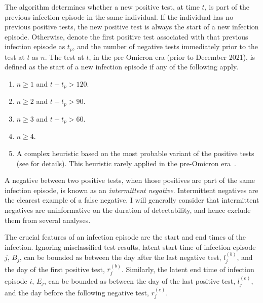 \documentclass[thesis.tex]{subfiles}
\begin{document}
The algorithm determines whether a new positive test, at time $t$, is part of the previous infection episode in the same individual.
If the individual has no previous positive tests, the new positive test is always the start of a new infection episode.
Otherwise, denote the first positive test associated with that previous infection episode as $t_p$, and the number of negative tests immediately prior to the test at $t$ as $n$.
The test at $t$, in the pre-Omicron era (prior to December 2021), is defined as the start of a new infection episode if any of the following apply.
\begin{enumerate}
  \item $n \geq 1$ and $t - t_p > 120$.
  \item $n \geq 2$ and $t - t_p > 90$.
  \item $n \geq 3$ and $t - t_p > 60$.
  \item $n \geq 4$.
  \item A complex heuristic based on the most probable variant of the positive tests (see \textcite{weiRisk} for details). This heuristic rarely applied in the pre-Omicron era~.
\end{enumerate}

A negative between two positive tests, when those positives are part of the same infection episode, is known as an \emph{intermittent negative}.
Intermittent negatives are the clearest example of a false negative.
I will generally consider that intermittent negatives are uninformative on the duration of detectability, and hence exclude them from several analyses.

The crucial features of an infection episode are the start and end times of the infection.
Ignoring misclassified test results, latent start time of infection episode $j$, $B_j$, can be bounded as between the day after the last negative test, $l_j^{(b)}$, and the day of the first positive test, $r_j^{(b)}$.
Similarly, the latent end time of infection episode $i$, $E_j$, can be bounded as between the day of the last positive test, $l_j^{(e)}$, and the day before the following negative test, $r_j^{(e)}$.
\end{document}
